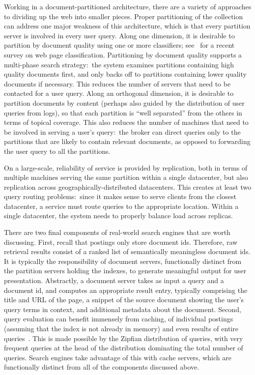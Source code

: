 Working in a document-partitioned architecture, there are a variety of
approaches to dividing up the web into smaller pieces.  Proper
partitioning of the collection can address one major weakness of this
architecture, which is that every partition server is involved in
every user query.  Along one dimension, it is desirable to partition
by document quality using one or more classifiers; see~\cite{qiACS09}
for a recent survey on web page classification.  Partitioning by
document quality supports a multi-phase search strategy:\ the system
examines partitions containing high quality documents first, and only
backs off to partitions containing lower quality documents if
necessary.  This reduces the number of servers that need to be
contacted for a user query.  Along an orthogonal dimension, it is
desirable to partition documents by content (perhaps also guided by
the distribution of user queries from logs), so that each partition is
``well separated'' from the others in terms of topical
coverage.  This also reduces the number of machines that need
to be involved in serving a user's query:\ the broker can direct
queries only to the partitions that are likely to contain relevant
documents, as opposed to forwarding the user query to all the
partitions.

On a large-scale, reliability of service is provided by replication,
both in terms of multiple machines serving the same partition within a
single datacenter, but also replication across
geographically-distributed datacenters.  This creates at least two
query routing problems:\ since it makes sense to serve clients from
the closest datacenter, a service must route queries to the
appropriate location.  Within a single datacenter, the system needs to
properly balance load across replicas.

There are two final components of real-world search engines that are
worth discussing.  First, recall that postings only store document
ids.  Therefore, raw retrieval results consist of a ranked list of
semantically meaningless document ids.  It is typically the
responsibility of document servers, functionally distinct from the
partition servers holding the indexes, to generate meaningful output
for user presentation.  Abstractly, a document server takes as
input a query and a document id, and computes an appropriate result
entry, typically comprising the title and URL of the page, a snippet
of the source document showing the user's query terms in context, and
additional metadata about the document.  Second, query evaluation can
benefit immensely from caching, of individual postings (assuming that
the index is not already in memory) and even results of entire
queries~\cite{Baeza-Yates_etal_SIGIR2007}.  This is made possible by
the Zipfian distribution of queries, with very frequent queries at the
head of the distribution dominating the total number of queries.
Search engines take advantage of this with cache servers, which are
functionally distinct from all of the components discussed above.


